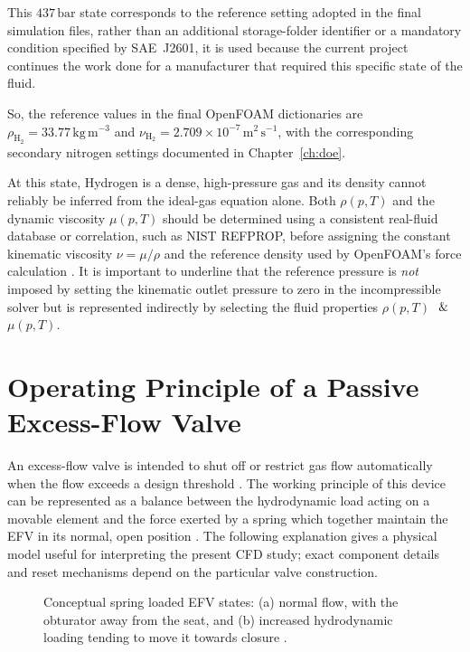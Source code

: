 This $437\,\mathrm{bar}$ state corresponds to the reference setting adopted in the final simulation files, rather than an additional storage-folder identifier or a mandatory condition specified by SAE~J2601, it is used because the current project continues the work done for a manufacturer that required this specific state of the fluid.

So, the reference values in the final OpenFOAM dictionaries are $\rho_{\mathrm{H}_2}=33.77\,\mathrm{kg\,m^{-3}}$ and $\nu_{\mathrm{H}_2}=2.709\times10^{-7}\,\mathrm{m^2\,s^{-1}}$, with the corresponding secondary nitrogen settings documented in Chapter~\ref{ch:doe}.

At this state, Hydrogen is a dense, high-pressure gas and its density cannot reliably be inferred from the ideal-gas equation alone. Both $\rho(p,T)$ and the dynamic viscosity $\mu(p,T)$ should be determined using a consistent real-fluid database or correlation, such as NIST REFPROP, before assigning the constant kinematic viscosity $\nu=\mu/\rho$ and the reference density used by OpenFOAM's force calculation \cite{nist_refprop,nist_refprop_online}. It is important to underline that the reference pressure is \emph{not} imposed by setting the kinematic outlet pressure to zero in the incompressible solver but is represented indirectly by selecting the fluid properties $\rho(p,T)$ $\And$ $\mu(p,T)$.

\section{Operating Principle of a Passive Excess-Flow Valve}
\label{sec:efv_principle}

An excess-flow valve is intended to shut off or restrict gas flow automatically when the flow exceeds a design threshold \cite{iso19880_3}. The working principle of this device can be represented as a balance between the hydrodynamic load acting on a movable element and the force exerted by a spring which together maintain the EFV in its normal, open position \cite{honeywell_efv}. The following explanation gives a physical model useful for interpreting the present CFD study; exact component details and reset mechanisms depend on the particular valve construction.


\begin{figure}[htbp]
\centering
\resizebox{\textwidth}{!}{}
\caption{Conceptual spring loaded EFV states: (a) normal flow, with the obturator away from the seat, and (b) increased hydrodynamic loading tending to move it towards closure \cite{iso19880_3,white2016}.}
\label{fig:efv_open_closing}
\end{figure}

